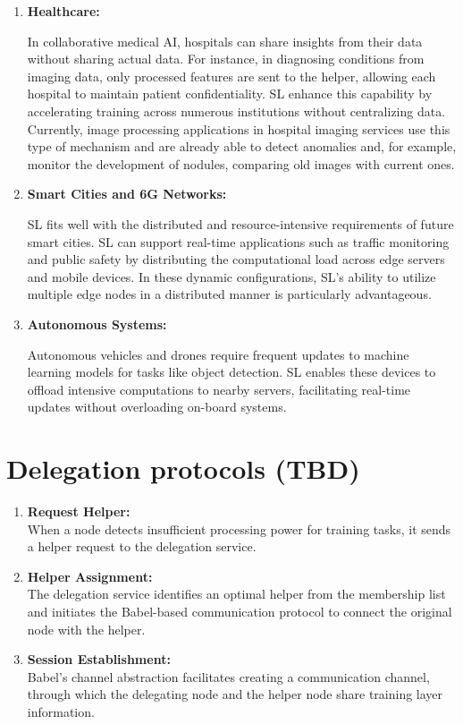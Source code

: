 \begin{enumerate}
	\item \textbf{Healthcare:}
	
	In collaborative medical AI, hospitals can share insights from their data without sharing actual data. For instance, in diagnosing conditions from imaging data, only processed features are sent to the helper, allowing each hospital to maintain patient confidentiality. \gls{SL} enhance this capability by accelerating training across numerous institutions without centralizing data. Currently, image processing applications in hospital imaging services use this type of mechanism and are already able to detect anomalies and, for example, monitor the development of nodules, comparing old images with current ones. 
	\item \textbf{Smart Cities and 6G Networks:}
	
	SL fits well with the distributed and resource-intensive requirements of future smart cities. SL can support real-time applications such as traffic monitoring and public safety by distributing the computational load across edge servers and mobile devices. In these dynamic configurations, \gls{SL}’s ability to utilize multiple edge nodes in a distributed manner is particularly advantageous. 
	\item \textbf{Autonomous Systems:}
	 
	Autonomous vehicles and drones require frequent updates to machine learning models for tasks like object detection. \gls{SL} enables these devices to offload intensive computations to nearby servers, facilitating real-time updates without overloading on-board systems. ​

\end{enumerate}


\section{Delegation protocols (TBD)}
\label{sec:delegation_protocols}


\begin{enumerate}
	\item \textbf{Request Helper:} \\ When a node detects insufficient processing power for training tasks, it sends a helper request to the delegation service.
	\item \textbf{Helper Assignment:} \\ The delegation service identifies an optimal helper from the membership list and initiates the Babel-based communication protocol to connect the original node with the helper.
	\item \textbf{Session Establishment:} \\ Babel's channel abstraction facilitates creating a communication channel, through which the delegating node and the helper node share training layer information.

\end{enumerate}

